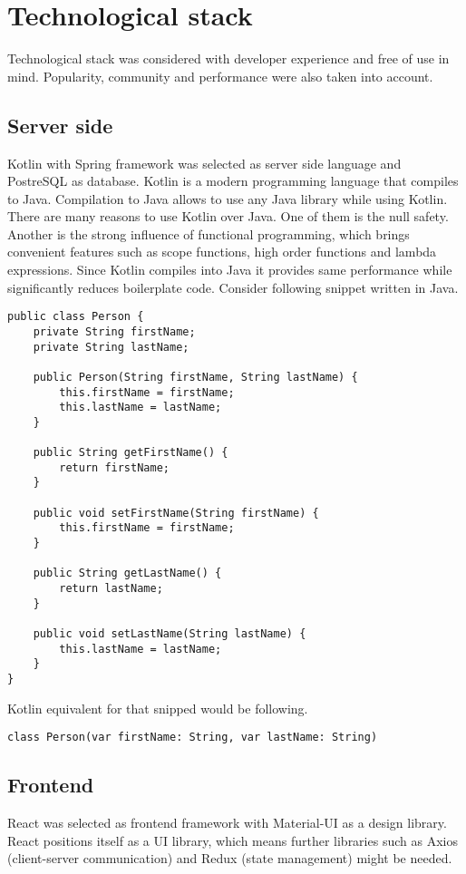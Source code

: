 
\section{Technological stack}\label{sec:technological-stack}

Technological stack was considered with developer experience and free of use in mind.
Popularity, community and performance were also taken into account.

\subsection{Server side}\label{subsec:ts-server-side}

Kotlin with Spring framework was selected as server side language and PostreSQL as database.\cite{kotlin, spring, postgresql}
Kotlin is a modern programming language that compiles to Java.
Compilation to Java allows to use any Java library while using Kotlin.
There are many reasons to use Kotlin over Java.
One of them is the null safety.
Another is the strong influence of functional programming, which brings convenient features such as scope functions, high order functions and lambda expressions.
Since Kotlin compiles into Java it provides same performance while significantly reduces boilerplate code.
Consider following snippet written in Java.\\

\begin{Verbatim}[frame=single]
public class Person {
    private String firstName;
    private String lastName;

    public Person(String firstName, String lastName) {
        this.firstName = firstName;
        this.lastName = lastName;
    }

    public String getFirstName() {
        return firstName;
    }

    public void setFirstName(String firstName) {
        this.firstName = firstName;
    }

    public String getLastName() {
        return lastName;
    }

    public void setLastName(String lastName) {
        this.lastName = lastName;
    }
}
\end{Verbatim}

Kotlin equivalent for that snipped would be following.\\
\begin{Verbatim}[frame=single]
class Person(var firstName: String, var lastName: String)
\end{Verbatim}

\subsection{Frontend}\label{subsec:ts-frontend}

React was selected as frontend framework with Material-UI as a design library.\cite{react, material}
React positions itself as a UI library, which means further libraries such as Axios (client-server communication) and Redux (state management) might be needed.\cite{axios, redux}

